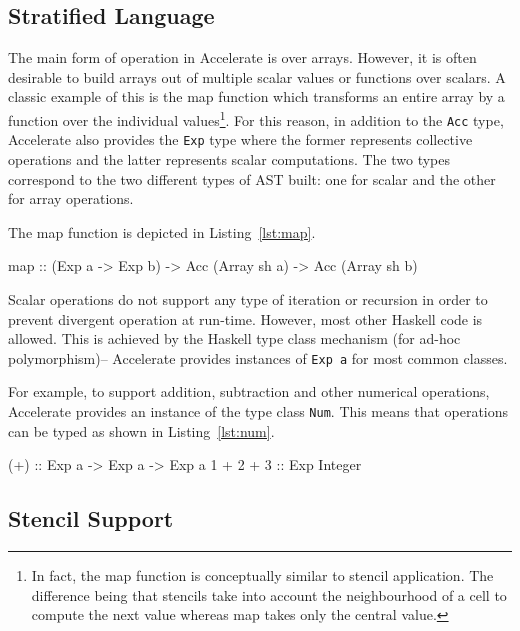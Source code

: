 \documentclass[
    12pt,
    a4paper,
    twoside,
    openright,
    ]{scrbook}
\begin{document}
\subsection{Stratified Language}

The main form of operation in Accelerate is over arrays. However, it is often
desirable to build arrays out of multiple scalar values or functions over
scalars. A classic example of this is the map function which transforms an
entire array by a function over the individual values\footnote{In fact, the map
  function is conceptually similar to stencil application. The difference being
  that stencils take into account the neighbourhood of a cell to compute
  the next value whereas map takes only the central value.}. For this reason, in addition to the \texttt{Acc} type,
Accelerate also provides the \texttt{Exp} type where the former represents
collective operations and the latter represents scalar computations. The two
types correspond to the two different types of AST built: one for scalar and the
other for array operations.

The map function is depicted in Listing~\ref{lst:map}.

\begin{hflisting}[label={lst:map}, caption=The type of the \texttt{map}
  operation as defined by Accelerate.]
map :: (Exp a -> Exp b) -> Acc (Array sh a)
       -> Acc (Array sh b)
\end{hflisting}

Scalar operations do not support any type of iteration or recursion in order to
prevent divergent operation at run-time. However, most other Haskell code is
allowed. This is achieved by the Haskell type class mechanism (for ad-hoc
polymorphism)-- Accelerate provides instances of \texttt{Exp a} for most common
classes.

For example, to support addition, subtraction and other numerical operations,
Accelerate provides an instance of the type class \texttt{Num}. This means that
operations can be typed as shown in Listing~\ref{lst:num}.

\begin{hflisting}[label={lst:num}, caption=The type of addition overloaded by Accelerate.]
(+) :: Exp a -> Exp a -> Exp a
1 + 2 + 3 :: Exp Integer
\end{hflisting}

\subsection{Stencil Support}
\end{document}
